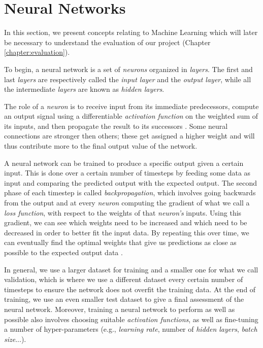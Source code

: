 \section{Neural Networks}
\label{sec:neural_networks}

In this section, we present concepts relating to Machine Learning which will later be necessary to understand the evaluation of our project (Chapter \ref{chapter:evaluation}).

To begin, a neural network is a set of \textit{neurons} organized in \textit{layers}. The first and last \textit{layers} are respectively called the \textit{input layer} and the \textit{output layer}, while all the intermediate \textit{layers} are known as \textit{hidden layers}.

The role of a \textit{neuron} is to receive input from its immediate predecessors, compute an output signal using a differentiable \textit{activation function} on the weighted sum of its inputs, and then propagate the result to its successors \cite{krose_introduction_1993}. Some neural connections are stronger then others; these get assigned a higher weight and will thus contribute more to the final output value of the network.

A neural network can be trained to produce a specific output given a certain input. This is done over a certain number of timesteps by feeding some data as input and comparing the predicted output with the expected output. The second phase of each timestep is called \textit{backpropagation}, which involves going backwards from the output and at every \textit{neuron} computing the gradient of what we call a \textit{loss function}, with respect to the weights of that \textit{neuron's} inputs. Using this gradient, we can see which weights need to be increased and which need to be decreased in order to better fit the input data. By repeating this over time, we can eventually find the optimal weights that give us predictions as close as possible to the expected output data \cite{krose_introduction_1993}.

In general, we use a larger dataset for training and a smaller one for what we call validation, which is where we use a different dataset every certain number of timesteps to ensure the network does not overfit the training data. At the end of training, we use an even smaller test dataset to give a final assessment of the neural network. Moreover, training a neural network to perform as well as possible also involves choosing suitable \textit{activation functions}, as well as fine-tuning a number of hyper-parameters (e.g., \textit{learning rate}, number of \textit{hidden layers}, \textit{batch size}...).

